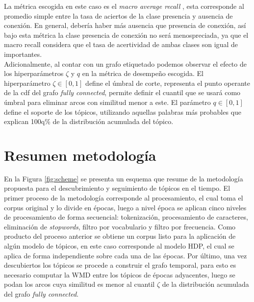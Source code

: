 \documentclass[letterpaper,12pt,oneside]{book} %
\begin{document}
La métrica escogida en este caso es el \textit{macro average recall} \citep{forman2003extensive}, esta corresponde al promedio simple entre la tasa de aciertos de la clase presencia y ausencia de conexión. En general, debería haber más ausencia que presencia de conexión, así bajo esta métrica la clase presencia de conexión no será menospreciada, ya que el macro recall considera que el tasa de acertividad de ambas clases son igual de importantes.\\

Adicionalmente, al contar con un grafo etiquetado podemos observar el efecto de los hiperparámetros $\zeta$ y $q$ en la métrica de desempeño escogida. El hiperparámetro $\zeta\in[0,1]$ define el úmbral de corte, representa el punto operante de la cdf del grafo \textit{fully connected}, permite definir el cuantil que se usará como úmbral para eliminar arcos con similitud menor a este. El parámetro $q \in [0,1]$ define el soporte de los tópicos, utilizando aquellas palabras más probables que explican 100q\% de la distribución acumulada del tópico. 

\section{Resumen metodología}

En la Figura \ref{fig:scheme} se presenta un esquema que resume de la metodología propuesta para el descubrimiento y seguimiento de tópicos en el tiempo. El primer proceso de la metodología corresponde al procesamiento, el cual toma el corpus original y lo divide en épocas, luego a nivel época se aplican cinco niveles de procesamiento de forma secuencial: tokenización, procesamiento de caracteres, eliminación de \textit{stopwords}, filtro por vocabulario y filtro por frecuencia. Como producto del proceso anterior se obtiene un corpus listo para la aplicación de algún modelo de tópicos, en este caso corresponde al modelo HDP, el cual se aplica de forma independiente sobre cada una de las épocas. Por último, una vez descubiertos los tópicos se procede a construir el grafo temporal, para esto es necesario computar la WMD entre los tópicos de épocas adyacentes, luego se podan los arcos cuya similitud es menor al cuantil $\zeta$ de la distribución acumulada del grafo \textit{fully connected}.

\def\db[#1,#2,#3,#4,#5]#6{%
  \node[draw, cylinder, alias=cyl, shape border rotate=90, aspect=#3, %
  minimum height=#1, minimum width=#2, outer sep=-0.5, color=black] (#4) at #5 {};%
  \node at #5 {#6};%
}
\def\boxtext[#1,#2,#3,#4,#5]#6{
        \node[draw=black, rounded corners, minimum height=#1,minimum width=#2, text width=6em] (#4) at #5 {}; 
        \node[anchor=#3,inner sep=2pt,] at (#4.#3)  {#6};
}
\def\isaedge[#1,#2,#3,#4];{ 
  \draw[-triangle 60,color=black!20!black,#4,fill=white] (#1) -- #3
  (#2);  
}
\end{document}
